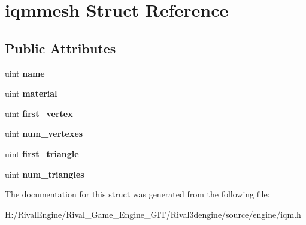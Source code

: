 \hypertarget{structiqmmesh}{}\section{iqmmesh Struct Reference}
\label{structiqmmesh}
\subsection*{Public Attributes}
\begin{DoxyCompactItemize}
\item 
\mbox{\label{structiqmmesh_a211952278d96e476e2a5aab1e7abd3b8}} 
uint {\bfseries name}
\item 
\mbox{\label{structiqmmesh_a4be21dda93a95077cc30079110003b5b}} 
uint {\bfseries material}
\item 
\mbox{\label{structiqmmesh_a1de2f47dc04828238b1cd26773ba8bc9}} 
uint {\bfseries first\+\_\+vertex}
\item 
\mbox{\label{structiqmmesh_a50a5e406100a31a853ea31c885919d69}} 
uint {\bfseries num\+\_\+vertexes}
\item 
\mbox{\label{structiqmmesh_a05678abf0e456f7a49ce02c859cb669b}} 
uint {\bfseries first\+\_\+triangle}
\item 
\mbox{\label{structiqmmesh_aebc2e4f93073857cabc62a1f00502b81}} 
uint {\bfseries num\+\_\+triangles}
\end{DoxyCompactItemize}


The documentation for this struct was generated from the following file\+:\begin{DoxyCompactItemize}
\item 
H\+:/\+Rival\+Engine/\+Rival\+\_\+\+Game\+\_\+\+Engine\+\_\+\+G\+I\+T/\+Rival3dengine/source/engine/iqm.\+h\end{DoxyCompactItemize}
